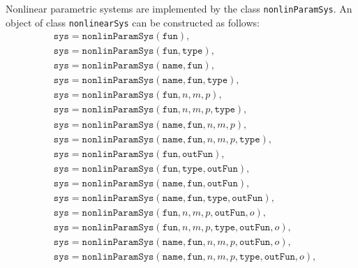 Nonlinear parametric systems are implemented by the class \texttt{nonlinParamSys}. An object of class \texttt{nonlinearSys} can be constructed as follows:
\begin{equation*}
	\begin{split}
		& \texttt{sys} = \texttt{nonlinParamSys}(\texttt{fun}), \\
		& \texttt{sys} = \texttt{nonlinParamSys}(\texttt{fun},\texttt{type}), \\
     	& \texttt{sys} = \texttt{nonlinParamSys}(\texttt{name},\texttt{fun}), \\
     	& \texttt{sys} = \texttt{nonlinParamSys}(\texttt{name},\texttt{fun},\texttt{type}), \\
    	& \texttt{sys} = \texttt{nonlinParamSys}(\texttt{fun},n,m,p), \\
    	& \texttt{sys} = \texttt{nonlinParamSys}(\texttt{fun},n,m,p,\texttt{type}), \\
     	& \texttt{sys} = \texttt{nonlinParamSys}(\texttt{name},\texttt{fun},n,m,p), \\
     	& \texttt{sys} = \texttt{nonlinParamSys}(\texttt{name},\texttt{fun},n,m,p,\texttt{type}), \\
     	& \texttt{sys} = \texttt{nonlinParamSys}(\texttt{fun},\texttt{outFun}), \\
     	& \texttt{sys} = \texttt{nonlinParamSys}(\texttt{fun},\texttt{type},\texttt{outFun}), \\
     	& \texttt{sys} = \texttt{nonlinParamSys}(\texttt{name},\texttt{fun},\texttt{outFun}), \\
     	& \texttt{sys} = \texttt{nonlinParamSys}(\texttt{name},\texttt{fun},\texttt{type},\texttt{outFun}), \\
     	& \texttt{sys} = \texttt{nonlinParamSys}(\texttt{fun},n,m,p,\texttt{outFun},o), \\
     	& \texttt{sys} = \texttt{nonlinParamSys}(\texttt{fun},n,m,p,\texttt{type},\texttt{outFun},o), \\
     	& \texttt{sys} = \texttt{nonlinParamSys}(\texttt{name},\texttt{fun},n,m,p,\texttt{outFun},o), \\
     	& \texttt{sys} = \texttt{nonlinParamSys}(\texttt{name},\texttt{fun},n,m,p,\texttt{type},\texttt{outFun},o),
	\end{split}
\end{equation*} 
